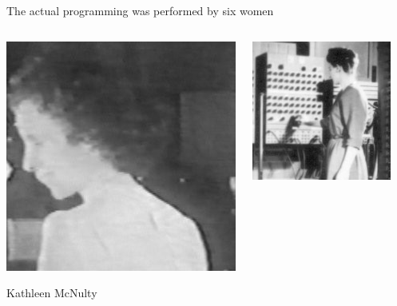 \documentclass[aspectratio=169]{beamer}
\begin{document}
\begin{frame}{The actual programming was performed by six women}
\begin{columns}[t]
\begin{center}
\includegraphics[width=\linewidth]{Kay-McNulty.jpg}

Kathleen McNulty
\end{center}

\begin{center}
\includegraphics[width=\linewidth]{Fran-Bilas.jpg}


\end{center}
\end{columns}
\end{frame}
\end{document}
